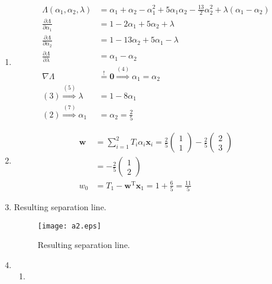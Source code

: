 \documentclass[DIN, pagenumber=false, fontsize=11pt, parskip=half]{scrartcl}
\begin{document}
\begin{enumerate}
        \item
        \begin{align}
            \Lambda(\alpha_1, \alpha_2, \lambda) &= \alpha_1 + \alpha_2 - \alpha_1^2 + 5 \alpha_1 \alpha_2 -\frac{13}{2} \alpha_2^2 + \lambda (\alpha_1 - \alpha_2) \\
            \frac{\partial \Lambda}{\partial \alpha_1} &= 1 - 2 \alpha_1 + 5 \alpha_2 + \lambda \\
            \frac{\partial \Lambda}{\partial \alpha_2} &= 1 - 13 \alpha_2 + 5 \alpha_1 - \lambda \\
            \frac{\partial \Lambda}{\partial \lambda} &= \alpha_1 - \alpha_2 \\
            \nabla \Lambda &\stackrel{!}{=} \mathbf{0} \stackrel{(4)}{\Rightarrow} \alpha_1 = \alpha_2 \\
            (3) \stackrel{(5)}{\Rightarrow} \lambda &= 1 - 8 \alpha_1 \\
            (2) \stackrel{(7)}{\Rightarrow} \alpha_1 &= \alpha_2 = \frac{2}{5} 
        \end{align}
        \item
        \begin{align*}
            \mathbf{w} &= \sum_{i=1}^2{T_i \alpha_i \mathbf{x}_i} = \frac{2}{5} \begin{pmatrix} 1 \\ 1 \end{pmatrix} - \frac{2}{5} \begin{pmatrix} 2 \\ 3 \end{pmatrix} \\
            &= -\frac{2}{5} \begin{pmatrix} 1 \\ 2 \end{pmatrix} \\
            w_0 &= T_1 - \mathbf{w}^\text{T} \mathbf{x}_1 = 1 + \frac{6}{5} = \frac{11}{5}
        \end{align*}
        \newpage
        \item
        Resulting separation line.
        \begin{figure}[h!]
            \centering
            \texttt{[image: a2.eps]}
            \caption{Resulting separation line.}
            \label{fig:a2}
        \end{figure}
        \item
        \begin{enumerate}
            \item

\end{enumerate}
\end{enumerate}
\end{document}
